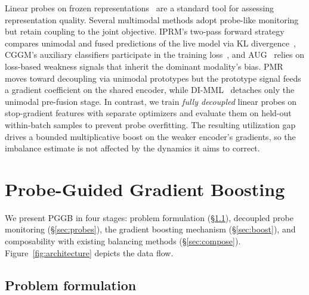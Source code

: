 \documentclass{article}
\begin{document}
Linear probes on frozen representations~\citep{alain2017understanding} are a standard tool for assessing representation quality. Several multimodal methods adopt probe-like monitoring but retain coupling to the joint objective. IPRM's two-pass forward strategy compares unimodal and fused predictions of the live model via KL divergence~\citep{yang2025iprm}, CGGM's auxiliary classifiers participate in the training loss~\citep{guo2024cggm}, and AUG~\citep{jiang2025aug} relies on loss-based weakness signals that inherit the dominant modality's bias. PMR~\citep{fan2023pmr} moves toward decoupling via unimodal prototypes but the prototype signal feeds a gradient coefficient on the shared encoder, while DI-MML~\citep{fan2024dimml} detaches only the unimodal pre-fusion stage. In contrast, we train \emph{fully decoupled} linear probes on stop-gradient features with separate optimizers and evaluate them on held-out within-batch samples to prevent probe overfitting. The resulting utilization gap drives a bounded multiplicative boost on the weaker encoder's gradients, so the imbalance estimate is not affected by the dynamics it aims to correct.


\section{Probe-Guided Gradient Boosting}
\label{sec:method}

We present PGGB in four stages: problem formulation (\S\ref{sec:problem}), decoupled probe monitoring (\S\ref{sec:probes}), the gradient boosting mechanism (\S\ref{sec:boost}), and composability with existing balancing methods (\S\ref{sec:compose}). Figure~\ref{fig:architecture} depicts the data flow.

\subsection{Problem formulation}
\label{sec:problem}
\end{document}
